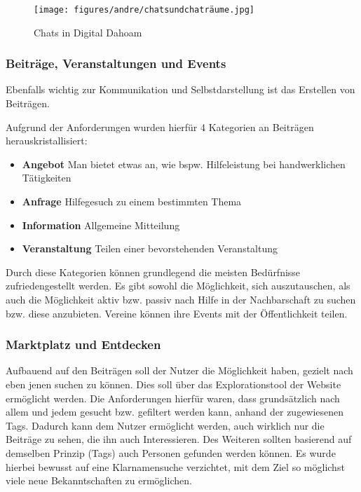 \begin{figure}[ht!]
    \centering
    \texttt{[image: figures/andre/chatsundchaträume.jpg]}
    \caption{Chats in Digital Dahoam}
    \label{fig:chatsundchaträume}
\end{figure}

\subsubsection{Beiträge, Veranstaltungen und Events}
Ebenfalls wichtig zur Kommunikation und Selbstdarstellung ist das Erstellen von Beiträgen. 

Aufgrund der Anforderungen wurden hierfür 4 Kategorien an Beiträgen herauskristallisiert:

\begin{itemize}
    \item	\textbf{Angebot} Man bietet etwas an, wie bspw. Hilfeleistung bei handwerklichen Tätigkeiten
    \item	\textbf{Anfrage} Hilfegesuch zu einem bestimmten Thema
    \item   \textbf{Information} Allgemeine Mitteilung
    \item 	\textbf{Veranstaltung} Teilen einer bevorstehenden Veranstaltung
\end{itemize}

Durch diese Kategorien können grundlegend die meisten Bedürfnisse zufriedengestellt werden. Es gibt sowohl die Möglichkeit, sich auszutauschen, als auch die Möglichkeit aktiv bzw. passiv nach Hilfe in der Nachbarschaft zu suchen bzw. diese anzubieten. Vereine können ihre Events mit der Öffentlichkeit teilen.

\subsubsection{Marktplatz und Entdecken}

Aufbauend auf den Beiträgen soll der Nutzer die Möglichkeit haben, gezielt nach eben jenen suchen zu können. Dies soll über das Explorationstool der Website ermöglicht werden.
Die Anforderungen hierfür waren, dass grundsätzlich nach allem und jedem gesucht bzw. gefiltert werden kann, anhand der zugewiesenen Tags. Dadurch kann dem Nutzer ermöglicht werden, auch wirklich nur die Beiträge zu sehen, die ihn auch Interessieren.
Des Weiteren sollten basierend auf demselben Prinzip (Tags) auch Personen gefunden werden können. Es wurde hierbei bewusst auf eine Klarnamensuche verzichtet, mit dem Ziel so möglichst viele neue Bekanntschaften zu ermöglichen. 


